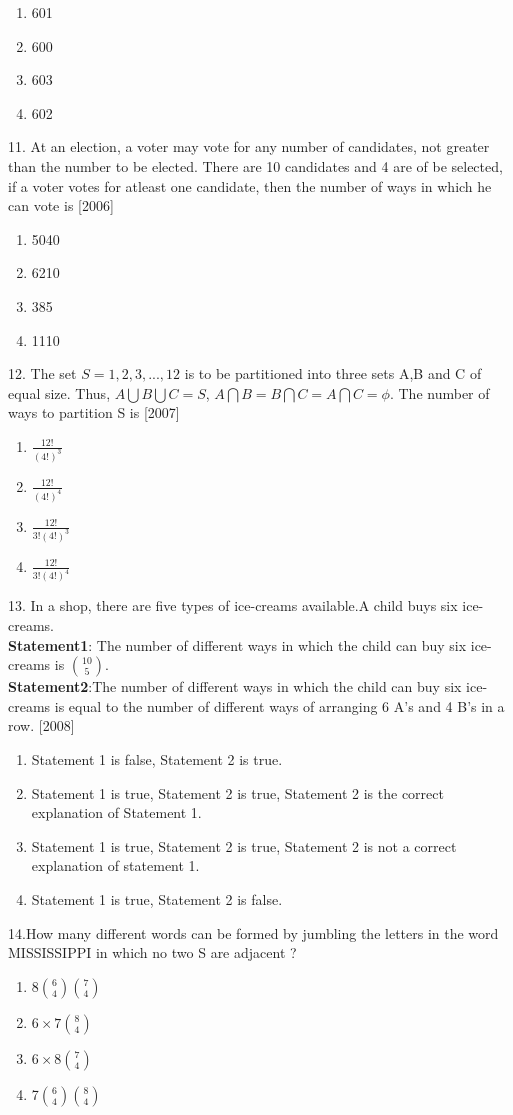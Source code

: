 \documentclass[journal,12pt,twocolumn]{IEEEtran}
\theoremstyle{remark}
\begin{document}
 \begin{enumerate}
     \item 601
     \item 600
     \item 603
     \item 602
 \end{enumerate}
11. At an election, a voter may vote for any number of candidates, not greater than the number to be elected. There are 10 candidates and 4 are of be selected, if a voter votes for atleast one candidate, then the number of ways in which he can vote is \hfill[2006]
\begin{enumerate}
 \item 5040
 \item 6210
 \item 385
 \item 1110
 \end{enumerate}
 12. The set $S={1,2,3,...,12}$ is to be partitioned into three sets A,B and C of equal size. Thus, $A\bigcup B\bigcup C=S$, $A \bigcap B=B \bigcap  C =A \bigcap C=\phi$. The number of ways to partition S is \hfill[2007]
 \begin{enumerate}
     \item $ \frac{12!}{(4!)^3}$
     \item $\frac{12!}{(4!)^4}$
     \item $\frac{12!}{3!(4!)^3}$
     \item $\frac{12!}{3!(4!)^4}$
 \end{enumerate}
 13. In a shop, there are five types of ice-creams available.A child buys six ice-creams.\\\textbf{Statement1}: The number of different ways in which the child can buy six ice-creams is $10\choose5$.\\\textbf{Statement2}:The number of different ways in which the child can buy six ice-creams is equal to the number of different ways of arranging 6 A's and 4 B's in a row. \hfill[2008]
 \begin{enumerate}
     \item Statement 1 is false, Statement 2 is true.
     \item Statement 1 is true, Statement 2 is true, Statement 2 is the correct explanation of Statement 1.
     \item Statement 1 is true, Statement 2 is true, Statement 2 is not a correct explanation of statement 1.
     \item Statement 1 is true, Statement 2 is false.
 \end{enumerate}
 14.How many different words can be formed by jumbling the letters in the word MISSISSIPPI in which no two S are adjacent ?
 \begin{enumerate}
     \item 8$6\choose4$$7\choose4$
     \item $6\times7$$8\choose4$
     \item $6\times8$$7\choose4$
     \item 7$6\choose4$$8\choose4$
 \end{enumerate}
 
\end{document}
